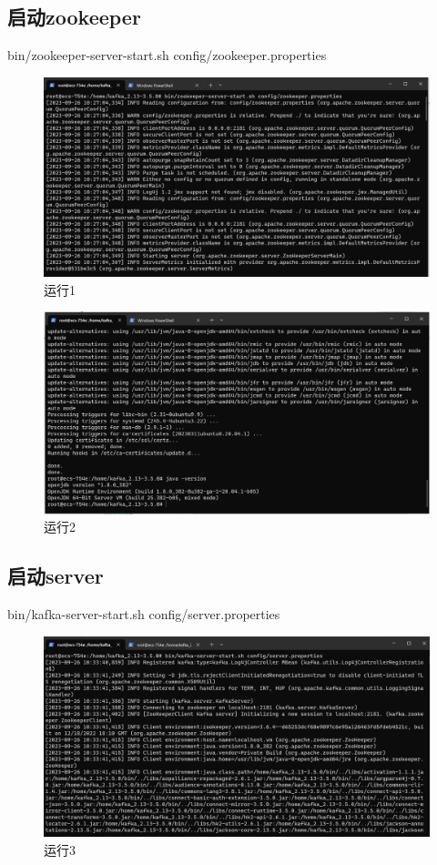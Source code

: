 \subsection{启动zookeeper}
bin/zookeeper-server-start.sh config/zookeeper.properties
\begin{figure}[H]
  \centering
  \includegraphics[width=\textwidth]{figure/4.png}
  \caption{运行1}
  \label{fig:my_label}
\end{figure}
\begin{figure}[H]
  \centering
  \includegraphics[width=\textwidth]{figure/3.png}
  \caption{运行2}
  \label{fig:my_label}
\end{figure}

\subsection{启动server}
bin/kafka-server-start.sh config/server.properties
\begin{figure}[H]
  \centering
  \includegraphics[width=\textwidth]{figure/5.png}
  \caption{运行3}
  \label{fig:my_label}
\end{figure}

